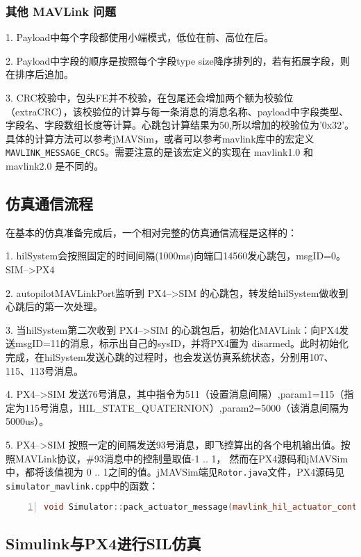 \subsubsection{其他 MAVLink 问题}
1. Payload中每个字段都使用小端模式，低位在前、高位在后。

2. Payload中字段的顺序是按照每个字段type size降序排列的，若有拓展字段，则在排序后追加。

3. CRC校验中，包头FE并不校验，在包尾还会增加两个额为校验位（extraCRC），该校验位的计算与每一条消息的消息名称、payload中字段类型、字段名、字段数组长度等计算。心跳包计算结果为50,所以增加的校验位为'0x32'。具体的计算方法可以参考jMAVSim，或者可以参考mavlink库中的宏定义\texttt{MAVLINK_MESSAGE_CRCS}。需要注意的是该宏定义的实现在 mavlink1.0 和 mavlink2.0 是不同的。

\subsection{仿真通信流程}
在基本的仿真准备完成后，一个相对完整的仿真通信流程是这样的：

1. hilSystem会按照固定的时间间隔(1000ms)向端口14560发心跳包，msgID=0。SIM-->PX4

2. autopilotMAVLinkPort监听到 PX4-->SIM 的心跳包，转发给hilSystem做收到心跳后的第一次处理。

3. 当hilSystem第二次收到 PX4-->SIM 的心跳包后，初始化MAVLink：向PX4发送msgID=11的消息，标示出自己的sysID，并将PX4置为 disarmed。此时初始化完成，在hilSystem发送心跳的过程时，也会发送仿真系统状态，分别用107、115、113号消息。

4. PX4-->SIM 发送76号消息，其中指令为511（设置消息间隔）,param1=115（指定为115号消息，HIL_STATE_QUATERNION）,param2=5000（该消息间隔为5000us）。

5. PX4-->SIM 按照一定的间隔发送93号消息，即飞控算出的各个电机输出值。按照MAVLink协议，\#93消息中的控制量取值-1 .. 1， 然而在PX4源码和jMAVSim中，都将该值视为{\color{red} 0 .. 1之间的值}。jMAVSim端见\texttt{Rotor.java}文件，PX4源码见\texttt{simulator_mavlink.cpp}中的函数：
\begin{lstlisting}[language=c++,numbers=left,firstnumber = 1,breaklines = true,numberstyle=\tiny,keywordstyle=\color{blue!70},commentstyle=\color{red!50!green!50!blue!50},frame=shadowbox, rulesepcolor=\color{red!20!green!20!blue!20}]
void Simulator::pack_actuator_message(mavlink_hil_actuator_controls_t &msg, unsigned index);
\end{lstlisting}

\subsection{Simulink与PX4进行SIL仿真}



